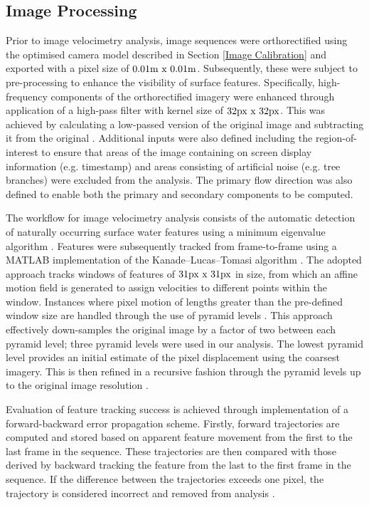 \documentclass[hess, manuscript]{copernicus}
\begin{document}
\subsection{Image Processing}
Prior to image velocimetry analysis, image sequences were orthorectified using the optimised camera model described in Section \ref{Image Calibration} and exported with a pixel size of $\textnormal{0.01m x 0.01m}$. Subsequently, these were subject to pre-processing to enhance the visibility of surface features. Specifically, high-frequency components of the orthorectified imagery were enhanced through application of a high-pass filter with kernel size of $\textnormal{32px x 32px}$. This was achieved by calculating a low-passed version of the original image and subtracting it from the original \citep{Thielicke2021}. Additional inputs were also defined including the region-of-interest to ensure that areas of the image containing on screen display information (e.g. timestamp) and areas consisting of artificial noise (e.g. tree branches) were excluded from the analysis. The primary flow direction was also defined to enable both the primary and secondary components to be computed. 

The workflow for image velocimetry analysis consists of the automatic detection of naturally occurring surface water features using a minimum eigenvalue algorithm \citep{Shi1994}. Features were subsequently tracked from frame-to-frame using a MATLAB implementation of the Kanade–Lucas–Tomasi algorithm \citep{Lucas1981, Tomasi1991, Shi1994, Perks2020a}. The adopted approach tracks windows of features of $\textnormal{31px x 31px}$ in size, from which an affine motion field is generated to assign velocities to different points within the window. Instances where pixel motion of lengths greater than the pre-defined window size are handled through the use of pyramid levels \citep{Bouguet2000}. This approach effectively down-samples the original image by a factor of two between each pyramid level; three pyramid levels were used in our analysis. The lowest pyramid level provides an initial estimate of the pixel displacement using the coarsest imagery. This is then refined in a recursive fashion through the pyramid levels up to the original image resolution \citep{Bouguet2000}.

Evaluation of feature tracking success is achieved through implementation of a forward-backward error propagation scheme. Firstly, forward trajectories are computed and stored based on apparent feature movement from the first to the last frame in the sequence. These trajectories are then compared with those derived by backward tracking the feature from the last to the first frame in the sequence. If the difference between the trajectories exceeds one pixel, the trajectory is considered incorrect and removed from analysis \citep{Kalal2010}.
\end{document}
